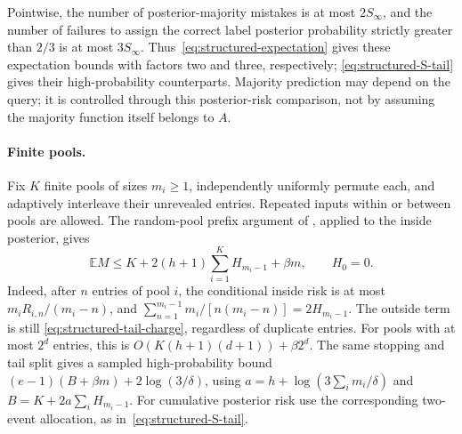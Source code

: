 Pointwise, the number of posterior-majority mistakes is at most
$2S_\infty$, and the number of failures to assign the correct label
posterior probability strictly greater than $2/3$ is at most
$3S_\infty$. Thus~\eqref{eq:structured-expectation} gives these expectation
bounds with factors two and three, respectively;
\eqref{eq:structured-S-tail} gives their high-probability counterparts.
Majority prediction may depend on the query; it is controlled through
this posterior-risk comparison, not by assuming the majority function
itself belongs to $A$.

\paragraph{Finite pools.}
Fix $K$ finite pools of sizes $m_i\ge1$, independently uniformly permute
each, and adaptively interleave their unrevealed entries. Repeated inputs
within or between pools are allowed. The random-pool prefix argument of
\cite{occam}, applied to the inside posterior, gives
\begin{equation}\label{eq:structured-pools}
 \mathbb E M\le
 K+2(h+1)\sum_{i=1}^K H_{m_i-1}+\beta m,
 \qquad H_0=0.
\end{equation}
Indeed, after $n$ entries of pool $i$, the conditional inside risk is at
most $m_iR_{i,n}/(m_i-n)$, and
$\sum_{n=1}^{m_i-1}m_i/[n(m_i-n)]=2H_{m_i-1}$. The outside term is still
\eqref{eq:structured-tail-charge}, regardless of duplicate entries.
For pools with at most $2^d$ entries, this is
$O(K(h+1)(d+1))+\beta2^d$.
The same stopping and tail split gives a sampled high-probability bound
$(e-1)(B+\beta m)+2\log(3/\delta)$, using
$a=h+\log(3\sum_i m_i/\delta)$ and
$B=K+2a\sum_i H_{m_i-1}$. For cumulative posterior risk use the
corresponding two-event allocation, as in~\eqref{eq:structured-S-tail}.


